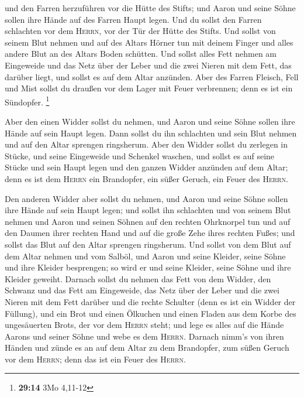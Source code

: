  und den Farren herzuführen vor die Hütte des Stifts; und
Aaron und seine Söhne sollen ihre Hände auf des Farren Haupt legen.
 Und du sollst den Farren schlachten vor dem
\textsc{Herrn}, vor der Tür der Hütte des Stifts.  Und
sollst von seinem Blut nehmen und auf des Altars Hörner tun mit deinem
Finger und alles andere Blut an des Altars Boden schütten.
 Und sollst alles Fett nehmen am Eingeweide und das Netz
über der Leber und die zwei Nieren mit dem Fett, das darüber liegt, und
sollst es auf dem Altar anzünden.  Aber des Farren
Fleisch, Fell und Mist sollst du draußen vor dem Lager mit Feuer
verbrennen; denn es ist ein Sündopfer. \footnote{\textbf{29:14} 3Mo
  4,11-12}

 Aber den einen Widder sollst du nehmen, und Aaron und
seine Söhne sollen ihre Hände auf sein Haupt legen.  Dann
sollst du ihn schlachten und sein Blut nehmen und auf den Altar sprengen
ringsherum.  Aber den Widder sollst du zerlegen in
Stücke, und seine Eingeweide und Schenkel waschen, und sollst es auf
seine Stücke und sein Haupt legen  und den ganzen Widder
anzünden auf dem Altar; denn es ist dem \textsc{Herrn} ein Brandopfer,
ein süßer Geruch, ein Feuer des \textsc{Herrn}.

 Den anderen Widder aber sollst du nehmen, und Aaron und
seine Söhne sollen ihre Hände auf sein Haupt legen;  und
sollst ihn schlachten und von seinem Blut nehmen und Aaron und seinen
Söhnen auf den rechten Ohrknorpel tun und auf den Daumen ihrer rechten
Hand und auf die große Zehe ihres rechten Fußes; und sollst das Blut auf
den Altar sprengen ringsherum.  Und sollst von dem Blut
auf dem Altar nehmen und vom Salböl, und Aaron und seine Kleider, seine
Söhne und ihre Kleider besprengen; so wird er und seine Kleider, seine
Söhne und ihre Kleider geweiht.  Darnach sollst du nehmen
das Fett von dem Widder, den Schwanz und das Fett am Eingeweide, das
Netz über der Leber und die zwei Nieren mit dem Fett darüber und die
rechte Schulter (denn es ist ein Widder der Füllung), 
und ein Brot und einen Ölkuchen und einen Fladen aus dem Korbe des
ungesäuerten Brots, der vor dem \textsc{Herrn} steht; 
und lege es alles auf die Hände Aarons und seiner Söhne und webe es dem
\textsc{Herrn}.  Darnach nimm's von ihren Händen und
zünde es an auf dem Altar zu dem Brandopfer, zum süßen Geruch vor dem
\textsc{Herrn}; denn das ist ein Feuer des \textsc{Herrn}.

